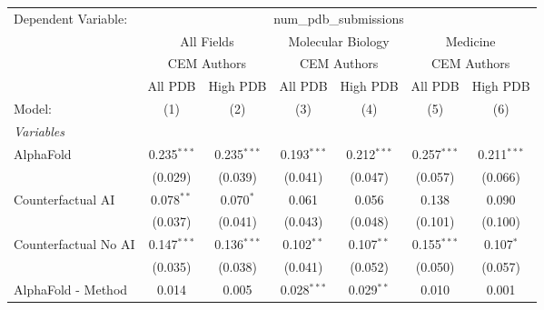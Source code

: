 \begingroup
\centering
\begin{tabular}{lcccccc}
   \tabularnewline \midrule \midrule
   Dependent Variable: & \multicolumn{6}{c}{num\_pdb\_submissions}\\
 & \multicolumn{2}{c}{All Fields} & \multicolumn{2}{c}{Molecular Biology} & \multicolumn{2}{c}{Medicine} \\
\cmidrule(lr){2-3} \cmidrule(lr){4-5} \cmidrule(lr){6-7}
 & \multicolumn{2}{c}{CEM Authors} & \multicolumn{2}{c}{CEM Authors} & \multicolumn{2}{c}{CEM Authors} \\
\cmidrule(lr){2-3} \cmidrule(lr){4-5} \cmidrule(lr){6-7}
 & \multicolumn{1}{c}{All PDB} & \multicolumn{1}{c}{High PDB} & \multicolumn{1}{c}{All PDB} & \multicolumn{1}{c}{High PDB} & \multicolumn{1}{c}{All PDB} & \multicolumn{1}{c}{High PDB} \\
\cmidrule(lr){2-2} \cmidrule(lr){3-3} \cmidrule(lr){4-4} \cmidrule(lr){5-5} \cmidrule(lr){6-6} \cmidrule(lr){7-7}
   Model:                                                     & (1)           & (2)           & (3)            & (4)           & (5)           & (6)\\  
   \midrule
   \emph{Variables}\\
   AlphaFold                                                  & 0.235$^{***}$ & 0.235$^{***}$ & 0.193$^{***}$  & 0.212$^{***}$ & 0.257$^{***}$ & 0.211$^{***}$\\   
                                                              & (0.029)       & (0.039)       & (0.041)        & (0.047)       & (0.057)       & (0.066)\\   
   Counterfactual AI                                          & 0.078$^{**}$  & 0.070$^{*}$   & 0.061          & 0.056         & 0.138         & 0.090\\   
                                                              & (0.037)       & (0.041)       & (0.043)        & (0.048)       & (0.101)       & (0.100)\\   
   Counterfactual No AI                                       & 0.147$^{***}$ & 0.136$^{***}$ & 0.102$^{**}$   & 0.107$^{**}$  & 0.155$^{***}$ & 0.107$^{*}$\\   
                                                              & (0.035)       & (0.038)       & (0.041)        & (0.052)       & (0.050)       & (0.057)\\   
   AlphaFold - Method                                         & 0.014         & 0.005         & 0.028$^{***}$  & 0.029$^{**}$  & 0.010         & 0.001\\   

\end{tabular}
